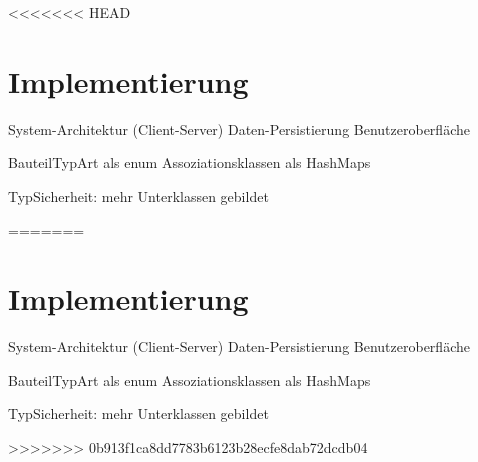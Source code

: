<<<<<<< HEAD
\section{Implementierung}
\label{sec:fachkonzept-implementierung}

System-Architektur (Client-Server)
Daten-Persistierung
Benutzeroberfläche

BauteilTypArt als enum
Assoziationsklassen als HashMaps

TypSicherheit: mehr Unterklassen gebildet






\autorende






\autorende
=======
\section{Implementierung}
\label{sec:fachkonzept-implementierung}

System-Architektur (Client-Server)
Daten-Persistierung
Benutzeroberfläche

BauteilTypArt als enum
Assoziationsklassen als HashMaps

TypSicherheit: mehr Unterklassen gebildet







>>>>>>> 0b913f1ca8dd7783b6123b28ecfe8dab72dcdb04
